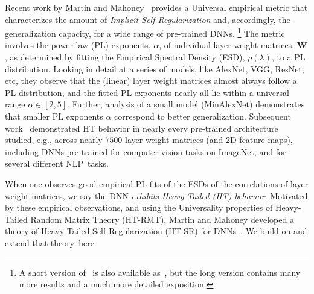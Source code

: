 Recent work by Martin and Mahoney~\cite{MM18_TR} provides a Universal empirical metric that characterizes the amount of \emph{Implicit Self-Regularization} and, accordingly, the generalization capacity, for a wide range of pre-trained DNNs.%
\footnote{A short version of~\cite{MM18_TR} is also available as~\cite{MM19_shortTR_of_longTR}, but the long version contains many more results and a much more detailed exposition.  }
The metric involves the power law (PL) exponents, $\alpha$, of individual layer weight matrices, $\mathbf{W}$, as determined by fitting the Empirical Spectral Density (ESD), $\rho(\lambda)$, to a PL distribution.
Looking in detail at a series of models, like AlexNet, VGG, ResNet, etc, they observe that the (linear) layer weight matrices almost always follow a PL distribution, and the fitted PL exponents nearly all lie within a universal range $\alpha\in[2,5]$. 
Further, analysis of a small model (MinAlexNet) demonstrates that smaller PL exponents $\alpha$ correspond to better generalization.
Subsequent work~\cite{MM18_unpub_work} demonstrated HT behavior in nearly every pre-trained architecture studied, e.g., across nearly $7500$ layer weight matrices (and 2D feature maps), including DNNs pre-trained for computer vision tasks on ImageNet, and for several different NLP~tasks.

When one observes good empirical PL fits of the ESDs of the correlations of layer weight matrices, we say the DNN \emph{exhibits Heavy-Tailed (HT) behavior}.
Motivated by these empirical observations, and using the Universality properties of Heavy-Tailed Random Matrix Theory (HT-RMT), Martin and Mahoney developed a theory of Heavy-Tailed Self-Regularization (HT-SR) for DNNs~\cite{MM17_TR,MM18_TR}.
We build on and extend that theory~here.

